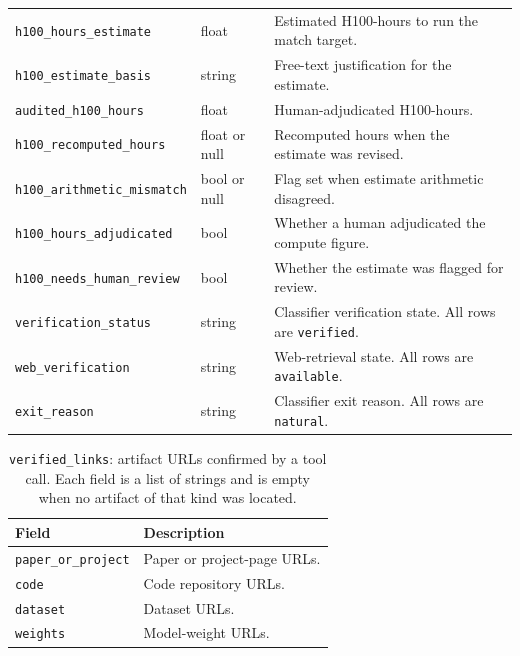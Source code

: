\documentclass{article} %
\begin{document}
\begin{table}[t]
\begin{center}
\begin{tabular}{@{}llp{7.2cm}@{}}
\texttt{h100\_hours\_estimate} & float & Estimated H100-hours to run the match target. \\
\texttt{h100\_estimate\_basis} & string & Free-text justification for the estimate. \\
\texttt{audited\_h100\_hours} & float & Human-adjudicated H100-hours. \\
\texttt{h100\_recomputed\_hours} & float or null & Recomputed hours when the estimate was revised. \\
\texttt{h100\_arithmetic\_mismatch} & bool or null & Flag set when estimate arithmetic disagreed. \\
\texttt{h100\_hours\_adjudicated} & bool & Whether a human adjudicated the compute figure. \\
\texttt{h100\_needs\_human\_review} & bool & Whether the estimate was flagged for review. \\
\texttt{verification\_status} & string & Classifier verification state. All rows are \texttt{verified}. \\
\texttt{web\_verification} & string & Web-retrieval state. All rows are \texttt{available}. \\
\texttt{exit\_reason} & string & Classifier exit reason. All rows are \texttt{natural}. \\
\bottomrule
\end{tabular}
\end{center}
\end{table}

\begin{table}[t]
\caption{\texttt{verified\_links}: artifact URLs confirmed by a tool call. Each
field is a list of strings and is empty when no artifact of that kind was
located.}
\label{tab:schema-links}
\begin{center}
\small
\begin{tabular}{@{}ll@{}}
\toprule
Field & Description \\
\midrule
\texttt{paper\_or\_project} & Paper or project-page URLs. \\
\texttt{code} & Code repository URLs. \\
\texttt{dataset} & Dataset URLs. \\
\texttt{weights} & Model-weight URLs. \\
\bottomrule
\end{tabular}
\end{center}
\end{table}
\end{document}

